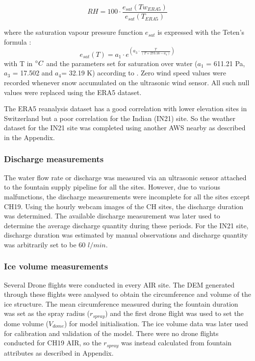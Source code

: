 \documentclass[utf8]{frontiersSCNS} %
\begin{document}
\begin{equation} RH = 100 \cdot
    \frac{e_{sat}(Tw_{ERA5})}{e_{sat}(T_{ERA5})} \end{equation} 

where the saturation vapour pressure function $e_{sat}$ is expressed with the Teten's formula \citep{Tetens}:
\begin{equation} e_{sat}(T)= a_1 \cdot e^{(a_3 \cdot \frac{T}{(T+273.16-a_4)})} \end{equation} with T in $\degree C$ and
the parameters set for saturation over water ($a_1$ = 611.21 Pa, $a_3$ = 17.502 and $a_4$= 32.19 K) according to
\cite{Buck_1981}.  Zero wind speed values were recorded whenever snow accumulated on the ultrasonic wind sensor. All
such null values were replaced using the ERA5 dataset. 

The ERA5 reanalysis dataset has a good correlation with lower elevation sites in Switzerland \citep{Scherrer_2020} but a
poor correlation for the Indian (IN21) site. So the weather dataset for the IN21 site was completed using another AWS
nearby as described in the Appendix.
  
\subsubsection{Discharge measurements} 
The water flow rate or discharge was measured via an ultrasonic sensor attached to the fountain supply pipeline for all
the sites. However, due to various malfunctions, the discharge measurements were incomplete for all the sites except
CH19. Using the hourly webcam images of the CH sites, the discharge duration was determined. The available discharge
measurement was later used to determine the average discharge quantity during these periods. For the IN21 site,
discharge duration was estimated by manual observations and discharge quantity was arbitrarily set to be 60 $l/min$.


\subsubsection{Ice volume measurements}
Several Drone flights were conducted in every AIR site. The DEM generated through these flights were analysed to obtain
the circumference and volume of the ice structure. The mean circumference measured during the fountain duration was set
as the spray radius ($r_{spray}$) and the first drone flight was used to set the dome volume ($V_{dome}$) for model
initialisation. The ice volume data was later used for calibration and validation of the model. There were no drone
flights conducted for CH19 AIR, so the $r_{spray}$ was instead calculated from fountain attributes as described in
Appendix.
 
\end{document}
